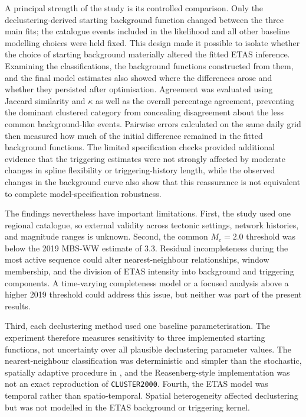 A principal strength of the study is its controlled comparison. Only the
declustering-derived starting background function changed between the three
main fits; the catalogue events included in the likelihood and all other
baseline modelling choices were held fixed. This design made it possible to
isolate whether the choice of starting background materially altered the
fitted ETAS inference. Examining the classifications, the background
functions constructed from them, and the final model estimates also showed
where the differences arose and whether they persisted after optimisation.
Agreement was evaluated using Jaccard similarity and $\kappa$ as well as the
overall percentage agreement, preventing the dominant clustered category
from concealing disagreement about the less common background-like events.
Pairwise errors calculated on the same daily grid then measured how much of
the initial difference remained in the fitted background functions. The
limited specification checks provided additional evidence that the
triggering estimates were not strongly affected by moderate changes in
spline flexibility or triggering-history length, while the observed changes
in the background curve also show that this reassurance is not equivalent to
complete model-specification robustness.

The findings nevertheless have important limitations. First, the study used
one regional catalogue, so external validity across tectonic settings,
network histories, and magnitude ranges is unknown. Second, the common
$M_c=2.0$ threshold was below the 2019 MBS-WW estimate of 3.3. Residual
incompleteness during the most active sequence could alter nearest-neighbour
relationships, window membership, and the division of ETAS intensity into
background and triggering components. A time-varying completeness model or a
focused analysis above a higher 2019 threshold could address this issue, but
neither was part of the present results.

Third, each declustering method used one baseline parameterisation. The
experiment therefore measures sensitivity to three implemented starting
functions, not uncertainty over all plausible declustering parameter values.
The nearest-neighbour classification was deterministic and simpler than the
stochastic, spatially adaptive procedure in \citet{zaliapin2020declustering},
and the Reasenberg-style implementation was not an exact reproduction of
\texttt{CLUSTER2000}. Fourth, the ETAS model was temporal rather than
spatio-temporal. Spatial heterogeneity affected declustering but was not
modelled in the ETAS background or triggering kernel.

